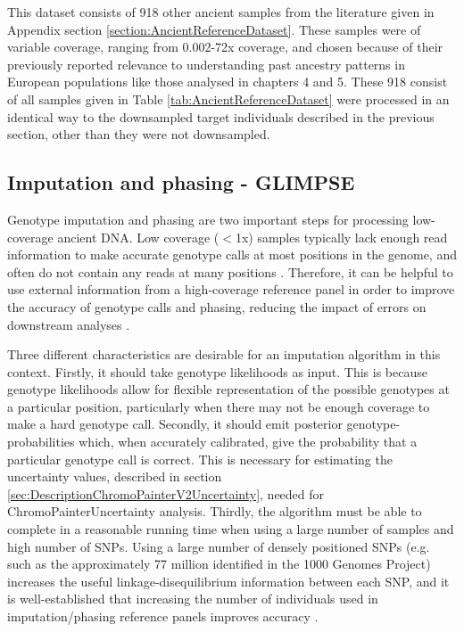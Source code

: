 {This dataset consists of 918 other ancient samples from the literature given in Appendix section \ref{section:AncientReferenceDataset}. These samples were of variable coverage, ranging from 0.002-72x coverage, and chosen because of their previously reported relevance to understanding past ancestry patterns in European populations like those analysed in chapters 4 and 5. These 918 consist of all samples given in Table \ref{tab:AncientReferenceDataset} were processed in an identical way to the downsampled target individuals described in the previous section, other than they were not downsampled.  

\subsection{Imputation and phasing - GLIMPSE}

Genotype imputation and phasing are two important steps for processing low-coverage ancient DNA. Low coverage ($<$1x) samples typically lack enough read information to make accurate genotype calls at most positions in the genome, and often do not contain any reads at many positions \cite{nielsen2011genotype}. Therefore, it can be helpful to use external information from a high-coverage reference panel in order to improve the accuracy of genotype calls and phasing, reducing the impact of errors on downstream analyses \cite{rubinacci2021efficient}. 

Three different characteristics are desirable for an imputation algorithm in this context. Firstly, it should take genotype likelihoods as input. This is because genotype likelihoods allow for flexible representation of the possible genotypes at a particular position, particularly when there may not be enough coverage to make a hard genotype call. Secondly, it should emit posterior genotype-probabilities which, when accurately calibrated, give the probability that a particular genotype call is correct. This is necessary for estimating the uncertainty values, described in section \ref{sec:DescriptionChromoPainterV2Uncertainty}, needed for ChromoPainterUncertainty analysis. Thirdly, the algorithm must be able to complete in a reasonable running time when using a large number of samples and high number of SNPs. Using a large number of densely positioned SNPs (e.g. such as the approximately 77 million identified in the 1000 Genomes Project) increases the useful linkage-disequilibrium information between each SNP, and it is well-established that increasing the number of individuals used in imputation/phasing reference panels improves accuracy \cite{delaneau2018integrative, HUANG2009235, mccarthy2016reference, rubinacci2021efficient}. 

}
